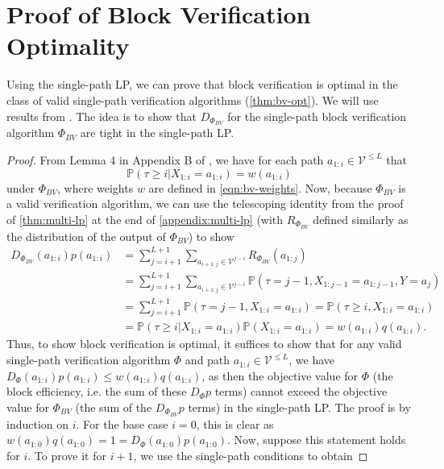 \documentclass{article}
\theoremstyle{plain}
\theoremstyle{definition}
\theoremstyle{remark}
\newcommand{\V}{\mathcal{V}}
\begin{document}
\section{Proof of Block Verification Optimality}
\label{appendix:bv-opt}

Using the single-path LP, we can prove that block verification is optimal in the class of valid single-path verification algorithms (\cref{thm:bv-opt}). We will use results from \citet{sun2024block}. The idea is to show that $D_{\Phi_{BV}}$ for the single-path block verification algorithm $\Phi_{BV}$ are tight in the single-path LP.

\begin{proof}
    From Lemma 4 in Appendix B of \citet{sun2024block}, we have for each path $a_{1:i} \in \V^{\leq L}$ that
    \begin{equation}
        \mathbb{P}(\tau \geq i|X_{1:i}=a_{1:i}) = w(a_{1:i})
    \end{equation}
    under $\Phi_{BV}$, where weights $w$ are defined in \cref{eqn:bv-weights}. Now, because $\Phi_{BV}$ is a valid verification algorithm, we can use the telescoping identity from the proof of \cref{thm:multi-lp} at the end of \cref{appendix:multi-lp} (with $R_{\Phi_{BV}}$ defined similarly as the distribution of the output of $\Phi_{BV}$) to show
    \begin{align}
        D_{\Phi_{BV}}(a_{1:i})p(a_{1:i})&= \sum_{j=i+1}^{L+1} \sum_{a_{i+1:j} \in \V^{j-i}} R_{\Phi_{BV}}(a_{1:j})\\
        &= \sum_{j=i+1}^{L+1} \sum_{a_{i+1:j} \in \V^{j-i}} \mathbb{P}(\tau=j-1,X_{1:j-1}=a_{1:j-1},Y=a_j)\\
        &= \sum_{j=i+1}^{L+1} \mathbb{P}(\tau=j-1,X_{1:i}=a_{1:i}) =\mathbb{P}(\tau \geq i,X_{1:i}=a_{1:i}) \\
        &= \mathbb{P}(\tau \geq i|X_{1:i}=a_{1:i})\mathbb{P}(X_{1:i}=a_{1:i}) = w(a_{1:i})q(a_{1:i}). 
    \end{align}
    Thus, to show block verification is optimal, it suffices to show that for any valid single-path verification algorithm $\Phi$ and path $a_{1:i} \in \V^{\leq L}$, we have $D_{\Phi}(a_{1:i})p(a_{1:i}) \leq w(a_{1:i})q(a_{1:i})$, as then the objective value for $\Phi$ (the block efficiency, i.e. the sum of these $D_\Phi p$ terms) cannot exceed the objective value for $\Phi_{BV}$ (the sum of the $D_{\Phi_{BV}}p$ terms) in the single-path LP. The proof is by induction on $i$. For the base case $i=0$, this is clear as $w(a_{1:0})q(a_{1:0})=1=D_{\Phi}(a_{1:0})p(a_{1:0})$. Now, suppose this statement holds for $i$. To prove it for $i+1$, we use the single-path conditions to obtain

\end{proof}
\end{document}
